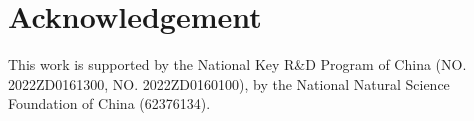 \vspace{-1mm}
\section*{Acknowledgement}
\vspace{-2mm}
This work is supported by the National Key R\&D Program of China (NO. 2022ZD0161300, NO. 2022ZD0160100), by the National Natural Science Foundation of China (62376134).